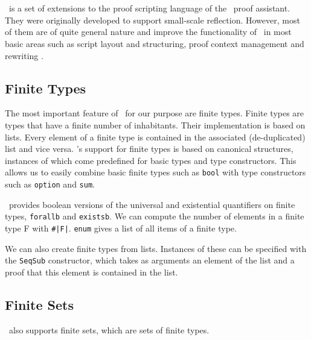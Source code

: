 \section{\ssreflect}


\ssreflect\ is a set of extensions to the proof scripting language of the \coq\ proof assistant. 
They were originally developed to support small-scale reflection. 
However, most of them are of quite general nature and improve the functionality of \coq\ in most basic areas such as script layout and structuring, proof context management and rewriting \cite{gonthier:inria-00258384}.


\subsection{Finite Types} %

The most important feature of \ssreflect\ for our purpose are finite types. 
Finite types are types that have a finite number of inhabitants.
Their implementation is based on lists.
Every element of a finite type is contained in the associated (de-duplicated) list and vice versa.
\ssreflect's support for finite types is based on canonical structures, instances of which come predefined for basic types and type constructors. 
This allows us to easily combine basic finite types such as \lstinline{bool} with type constructors such as \lstinline{option} and \lstinline{sum}. 

\ssreflect\ provides boolean versions of the universal and existential quantifiers on finite types, \lstinline{forallb} and \lstinline{existsb}.
We can compute the number of elements in a finite type F with \lstinline{#|F|}.
\lstinline{enum} gives a list of all items of a finite type. 

We can also create finite types from lists.
Instances of these can be specified with the \lstinline{SeqSub} constructor, 
which takes as arguments an element of the list and a proof that this element is contained in the list.


\subsection{Finite Sets}
\ssreflect\ also supports finite sets, which are sets of finite types.

